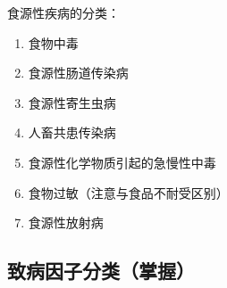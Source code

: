 食源性疾病的分类：
\begin{enumerate}[leftmargin=*]
    \item 食物中毒
    \item 食源性肠道传染病
    \item 食源性寄生虫病
    \item 人畜共患传染病
    \item 食源性化学物质引起的急慢性中毒
    \item 食物过敏（注意与食品不耐受区别）
    \item 食源性放射病
\end{enumerate}

\subsection{致病因子分类（掌握）}

